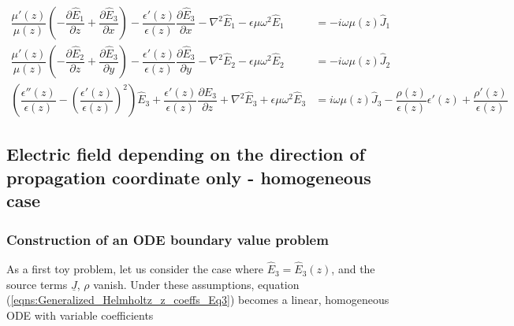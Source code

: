 \documentclass[12pt,twoside]{article}
\begin{document}
\begin{subequations}
\begin{align}
\dfrac{\mu'(z)}{\mu(z)}\left( -\dfrac{\partial \hat{E}_1}{\partial z} + \dfrac{\partial \hat{E}_3}{\partial x}\right)-\dfrac{\epsilon'(z)}{\epsilon(z)}\dfrac{\partial \hat{E}_3}{\partial x}-\nabla^2 \hat{E}_1 - \epsilon \mu \omega^2 \hat{E}_1 &= -i\omega \mu(z)\hat{J}_1	\label{eqns:Generalized_Helmholtz_z_coeffs_Eq1}\\
\dfrac{\mu'(z)}{\mu(z)}\left( -\dfrac{\partial \hat{E}_2}{\partial z} + \dfrac{\partial \hat{E}_3}{\partial y}\right)-\dfrac{\epsilon'(z)}{\epsilon(z)}\dfrac{\partial \hat{E}_3}{\partial y}-\nabla^2 \hat{E}_2 - \epsilon \mu \omega^2 \hat{E}_2 &= -i \omega \mu(z)\hat{J}_2	\label{eqns:Generalized_Helmholtz_z_coeffs_Eq2}\\
\left( \dfrac{\epsilon''(z)}{\epsilon(z)}-\left( \dfrac{\epsilon'(z)}{\epsilon(z)}\right)^2 \right)\hat{E}_3 +\dfrac{\epsilon'(z)}{\epsilon(z)}\dfrac{\partial \hat{E}_3}{\partial z} + \nabla^2 \hat{E}_3 +\epsilon \mu \omega^2 \hat{E}_3 &= i \omega \mu(z)\hat{J}_3 - \dfrac{\rho(z)}{\epsilon(z)}\epsilon'(z) + \dfrac{\rho'(z)}{\epsilon(z)} \label{eqns:Generalized_Helmholtz_z_coeffs_Eq3}
\end{align}
\end{subequations}



\subsection{Electric field depending on the direction of propagation coordinate only - homogeneous case}
\subsubsection{Construction of an ODE boundary value problem}
As a first toy problem, let us consider the case where $\hat{E}_3 = \hat{E}_3(z)$, and the source terms $\underline{J}$, $\rho$ vanish. Under these assumptions, equation (\ref{eqns:Generalized_Helmholtz_z_coeffs_Eq3}) becomes a linear, homogeneous ODE with variable coefficients
\end{document}
